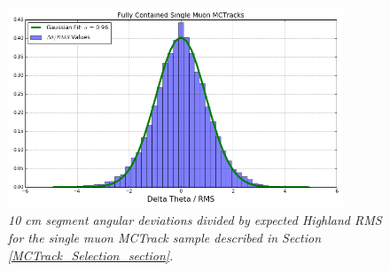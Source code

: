 \begin{figure}[ht!]
\begin{center}
\includegraphics[width=100mm]{Figures/Highland_validation_SingleMuonMCTrack.png}
\end{center}
\caption{\textit{10 cm segment angular deviations divided by expected Highland RMS for the single muon {\sc MCTrack} sample described in Section \ref{MCTrack_Selection_section}.}}
\label{Highland_validation_MCTracks_fig}
\end{figure}















